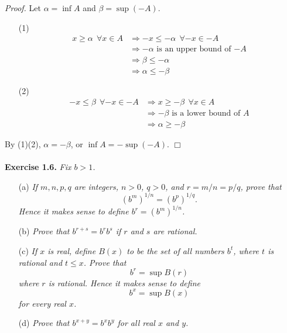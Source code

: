 \documentclass{article}
\begin{document}
\emph{Proof.}
Let $\alpha = \inf A$ and $\beta = \sup(-A)$.
\begin{enumerate}
\item[(1)]
\begin{align*}
x \geq \alpha \:\: \forall x \in A
&\Longrightarrow
-x \leq -\alpha \:\: \forall -x \in -A \\
&\Longrightarrow
-\alpha \text{ is an upper bound of $-A$} \\
&\Longrightarrow
\beta \leq -\alpha \\
&\Longrightarrow
\alpha \leq -\beta
\end{align*}
\item[(2)]
\begin{align*}
-x \leq \beta \:\: \forall -x \in -A
&\Longrightarrow
x \geq -\beta \:\: \forall x \in A \\
&\Longrightarrow
-\beta \text{ is a lower bound of $A$} \\
&\Longrightarrow
\alpha \geq -\beta
\end{align*}
\end{enumerate}
By (1)(2), $\alpha = -\beta$, or $\inf A = -\sup(-A)$.
$\Box$ \\\\






\textbf{Exercise 1.6.}
\emph{Fix $b > 1$.}
\begin{enumerate}
\item[(a)]
\emph{If $m,n,p,q$ are integers, $n>0$, $q>0$, and $r=m/n=p/q$, prove that
$$(b^m)^{1/n} = (b^p)^{1/q}.$$
Hence it makes sense to define $b^r = (b^m)^{1/n}$.}
\item[(b)]
\emph{Prove that $b^{r+s} = b^r b^s$ if $r$ and $s$ are rational.}
\item[(c)]
\emph{If $x$ is real, define $B(x)$ to be the set of all numbers $b^t$,
where $t$ is rational and $t \leq x$.
Prove that
$$b^r = \sup B(r)$$
where $r$ is rational.
Hence it makes sense to define
$$b^x = \sup B(x)$$
for every real $x$.}
\item[(d)]
\emph{Prove that $b^{x+y} = b^x b^y$ for all real $x$ and $y$.} \\
\end{enumerate}
\end{document}
